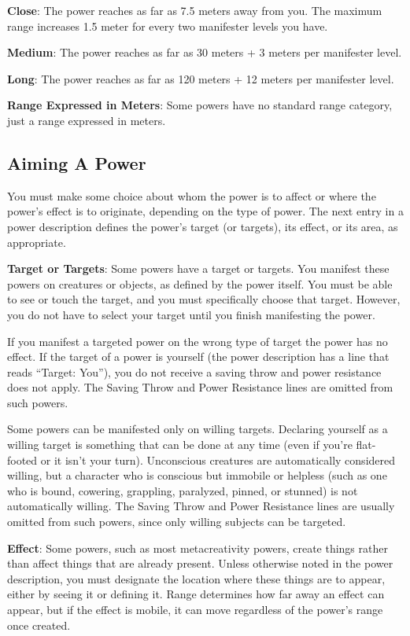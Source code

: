 \textbf{Close}: The power reaches as far as 7.5 meters away from you. The maximum range increases 1.5 meter for every two manifester levels you have.

\textbf{Medium}: The power reaches as far as 30 meters + 3 meters per manifester level.

\textbf{Long}: The power reaches as far as 120 meters + 12 meters per manifester level.

\textbf{Range Expressed in Meters}: Some powers have no standard range category, just a range expressed in meters.

\subsection{Aiming A Power}
You must make some choice about whom the power is to affect or where the power's effect is to originate, depending on the type of power. The next entry in a power description defines the power's target (or targets), its effect, or its area, as appropriate.

\textbf{Target or Targets}: Some powers have a target or targets. You manifest these powers on creatures or objects, as defined by the power itself. You must be able to see or touch the target, and you must specifically choose that target. However, you do not have to select your target until you finish manifesting the power.

If you manifest a targeted power on the wrong type of target the power has no effect. If the target of a power is yourself (the power description has a line that reads ``Target: You''), you do not receive a saving throw and power resistance does not apply. The Saving Throw and Power Resistance lines are omitted from such powers.

Some powers can be manifested only on willing targets. Declaring yourself as a willing target is something that can be done at any time (even if you're flat-footed or it isn't your turn). Unconscious creatures are automatically considered willing, but a character who is conscious but immobile or helpless (such as one who is bound, cowering, grappling, paralyzed, pinned, or stunned) is not automatically willing. The Saving Throw and Power Resistance lines are usually omitted from such powers, since only willing subjects can be targeted.

\textbf{Effect}: Some powers, such as most metacreativity powers, create things rather than affect things that are already present. Unless otherwise noted in the power description, you must designate the location where these things are to appear, either by seeing it or defining it. Range determines how far away an effect can appear, but if the effect is mobile, it can move regardless of the power's range once created.

